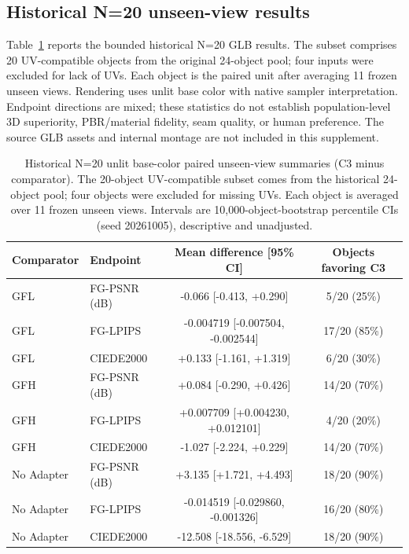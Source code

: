 \documentclass[11pt]{article}
\begin{document}
\subsection*{Historical N=20 unseen-view results}
Table~\ref{tab:supp-n20} reports the bounded historical N=20 GLB results. The subset comprises 20 UV-compatible objects from the original 24-object pool; four inputs were excluded for lack of UVs. Each object is the paired unit after averaging 11 frozen unseen views. Rendering uses unlit base color with native sampler interpretation. Endpoint directions are mixed; these statistics do not establish population-level 3D superiority, PBR/material fidelity, seam quality, or human preference. The source GLB assets and internal montage are not included in this supplement.
\begin{table}[ht]
\centering\small
\caption{Historical N=20 unlit base-color paired unseen-view summaries (C3 minus comparator). The 20-object UV-compatible subset comes from the historical 24-object pool; four objects were excluded for missing UVs. Each object is averaged over 11 frozen unseen views. Intervals are 10,000-object-bootstrap percentile CIs (seed 20261005), descriptive and unadjusted.}\label{tab:supp-n20}
\begin{tabular}{llcc}\toprule Comparator & Endpoint & Mean difference [95\% CI] & Objects favoring C3 \\\midrule
GFL & FG-PSNR (dB) & -0.066 [-0.413, +0.290] & 5/20 (25\%) \\
GFL & FG-LPIPS & -0.004719 [-0.007504, -0.002544] & 17/20 (85\%) \\
GFL & CIEDE2000 & +0.133 [-1.161, +1.319] & 6/20 (30\%) \\
GFH & FG-PSNR (dB) & +0.084 [-0.290, +0.426] & 14/20 (70\%) \\
GFH & FG-LPIPS & +0.007709 [+0.004230, +0.012101] & 4/20 (20\%) \\
GFH & CIEDE2000 & -1.027 [-2.224, +0.229] & 14/20 (70\%) \\
No Adapter & FG-PSNR (dB) & +3.135 [+1.721, +4.493] & 18/20 (90\%) \\
No Adapter & FG-LPIPS & -0.014519 [-0.029860, -0.001326] & 16/20 (80\%) \\
No Adapter & CIEDE2000 & -12.508 [-18.556, -6.529] & 18/20 (90\%) \\
\bottomrule\end{tabular}
\end{table}
\end{document}
